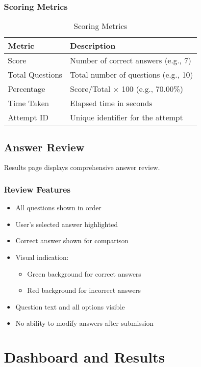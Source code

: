 \documentclass[12pt,a4paper]{report}
\begin{document}
\subsection{Scoring Metrics}

\begin{table}[H]
\centering
\caption{Scoring Metrics}
\begin{tabular}{@{}ll@{}}
\toprule
\textbf{Metric} & \textbf{Description} \\ \midrule
Score & Number of correct answers (e.g., 7) \\
Total Questions & Total number of questions (e.g., 10) \\
Percentage & Score/Total × 100 (e.g., 70.00\%) \\
Time Taken & Elapsed time in seconds \\
Attempt ID & Unique identifier for the attempt \\ \bottomrule
\end{tabular}
\end{table}

\section{Answer Review}

Results page displays comprehensive answer review.

\subsection{Review Features}

\begin{itemize}
    \item All questions shown in order
    \item User's selected answer highlighted
    \item Correct answer shown for comparison
    \item Visual indication:
    \begin{itemize}
        \item Green background for correct answers
        \item Red background for incorrect answers
    \end{itemize}
    \item Question text and all options visible
    \item No ability to modify answers after submission
\end{itemize}

\chapter{Dashboard and Results}
\end{document}
